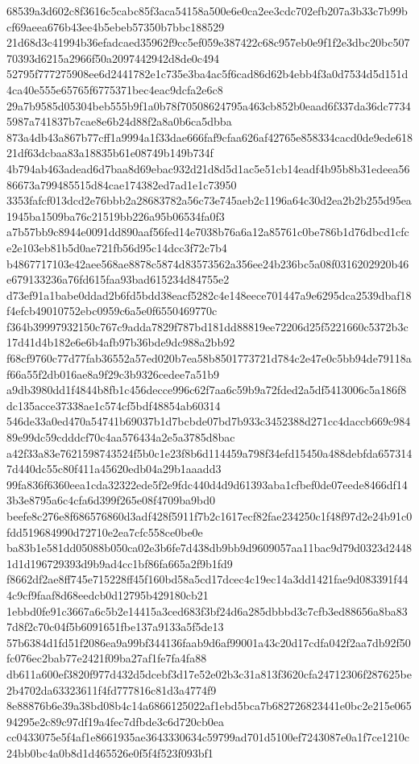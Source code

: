 \documentclass[11pt,a4paper]{article}
\begin{document}
{68539a3d602c8f3616c5cabc85f3aca54158a500e6e0ca2ee3cdc702efb207a3b33c7b99bcf69aeea676b43ee4b5ebeb57350b7bbc188529
21d68d3c41994b36efadcaed35962f9cc5ef059e387422c68c957eb0e9f1f2e3dbc20bc50770393d6215a2966f50a2097442942d8de0c494
52795f777275908ee6d2441782e1c735e3ba4ac5f6cad86d62b4ebb4f3a0d7534d5d151d4ca40e555e65765f6775371bec4eac9dcfa2e6c8
29a7b9585d05304beb555b9f1a0b78f70508624795a463cb852b0eaad6f337da36dc77345987a741837b7cae8e6b24d88f2a8a0b6ca5dbba
873a4db43a867b77cff1a9994a1f33dae666faf9cfaa626af42765e858334cacd0de9ede61821df63dcbaa83a18835b61e08749b149b734f
4b794ab463adead6d7baa8d69ebac932d21d8d5d1ac5e51cb14eadf4b95b8b31edeea5686673a799485515d84cae174382ed7ad1e1c73950
3353fafcf013dcd2e76bbb2a28683782a56c73e745aeb2c1196a64c30d2ea2b2b255d95ea1945ba1509ba76c21519bb226a95b06534fa0f3
a7b57bb9c8944e0091dd890aaf56fed14e7038b76a6a12a85761c0be786b1d76dbcd1cfce2e103eb81b5d0ae721fb56d95c14dcc3f72c7b4
b4867717103e42aee568ae8878c5874d83573562a356ee24b236bc5a08f0316202920b46e679133236a76fd615faa93bad615234d84755e2
d73ef91a1babe0ddad2b6fd5bdd38eacf5282c4e148eece701447a9e6295dca2539dbaf18f4efcb49010752ebc0959c6a5e0f6550469770c
f364b39997932150c767c9adda7829f787bd181dd88819ee72206d25f5221660c5372b3c17d41d4b182e6e6b4afb97b36bde9dc988a2bb92
f68cf9760c77d77fab36552a57ed020b7ea58b8501773721d784c2e47e0c5bb94de79118af66a55f2db016ae8a9f29c3b9326cedee7a51b9
a9db3980dd1f4844b8fb1c456decce996c62f7aa6c59b9a72fded2a5df5413006c5a186f8dc135acce37338ae1c574cf5bdf48854ab60314
546de33a0ed470a54741b69037b1d7bcbde07bd7b933c3452388d271cc4daccb669c98489e99dc59cdddcf70c4aa576434a2e5a3785d8bac
a42f33a83e7621598743524f5b0c1e23f8b6d114459a798f34efd15450a488debfda6573147d440dc55c80f411a45620edb04a29b1aaadd3
99fa836f6360eea1cda32322ede5f2e9fdc440d4d9d61393aba1cfbef0de07eede8466df143b3e8795a6c4cfa6d399f265e08f4709ba9bd0
beefe8c276e8f686576860d3adf428f5911f7b2c1617ecf82fae234250c1f48f97d2e24b91c0fdd519684990d72710e2ea7cfc558ce0be0e
ba83b1e581dd05088b050ca02e3b6fe7d438db9bb9d9609057aa11bac9d79d0323d24481d1d196729393d9b9ad4cc1bf86fa665a2f9b1fd9
f8662df2ae8ff745e715228ff45f160bd58a5cd17dcec4c19ec14a3dd1421fae9d083391f444c9cf9faaf8d68eedcb0d12795b429180cb21
1ebbd0fe91c3667a6c5b2e14415a3ced683f3bf24d6a285dbbbd3c7cfb3ed88656a8ba837d8f2c70c04f5b6091651fbe137a9133a5f5de13
57b6384d1fd51f2086ea9a99bf344136faab9d6af99001a43c20d17cdfa042f2aa7db92f50fc076ec2bab77e2421f09ba27af1fe7fa4fa88
db611a600ef3820f977d432d5dcebf3d17e52e02b3c31a813f3620cfa24712306f287625be2b4702da63323611f4fd777816c81d3a4774f9
8e88876b6e39a38bd08b4c14a6866125022af1ebd5bca7b682726823441e0bc2e215e06594295e2c89c97df19a4fec7dfbde3c6d720cb0ea
cc0433075e5f4af1e8661935ae3643330634c59799ad701d5100ef7243087e0a1f7ce1210c24bb0bc4a0b8d1d465526e0f5f4f523f093bf1
}
\end{document}
